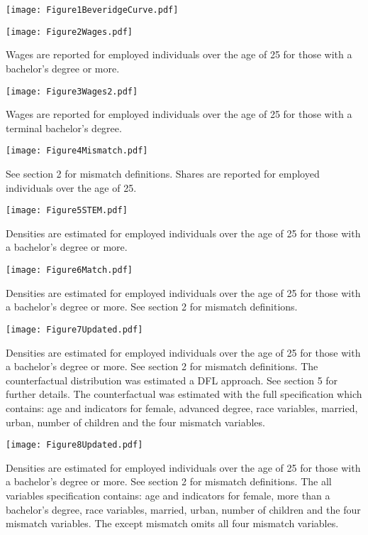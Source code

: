 \documentclass[11pt]{article}
\theoremstyle{definition}
\begin{document}
\begin{center}
\texttt{[image: Figure1BeveridgeCurve.pdf]}
\end{center}

\begin{center}
\texttt{[image: Figure2Wages.pdf]}
\end{center}
Wages are reported for employed individuals over the age of 25 for those with a bachelor's degree or more.  

\begin{center}
\texttt{[image: Figure3Wages2.pdf]}
\end{center}
Wages are reported for employed individuals over the age of 25 for those with a terminal bachelor's degree.  

\begin{center}
\texttt{[image: Figure4Mismatch.pdf]}
\end{center}
See section 2 for mismatch definitions.  Shares are reported for employed individuals over the age of 25.  

\begin{center}
\texttt{[image: Figure5STEM.pdf]}
\end{center}
Densities are estimated for employed individuals over the age of 25 for those with a bachelor's degree or more.  

\begin{center}
\texttt{[image: Figure6Match.pdf]}
\end{center}
Densities are estimated for employed individuals over the age of 25 for those with a bachelor's degree or more.  See section 2 for mismatch definitions.

\begin{center}
\texttt{[image: Figure7Updated.pdf]}
\end{center}
Densities are estimated for employed individuals over the age of 25 for those with a bachelor's degree or more.  See section 2 for mismatch definitions.  The counterfactual distribution was estimated a DFL approach.  See section 5 for further details. The counterfactual was estimated with the full specification which contains: age and indicators for female, advanced degree, race variables, married, urban, number of children and the four mismatch variables.

\begin{center}
\texttt{[image: Figure8Updated.pdf]}
\end{center}
Densities are estimated for employed individuals over the age of 25 for those with a bachelor's degree or more.  See section 2 for mismatch definitions.  The all variables specification contains: age and indicators for female, more than a bachelor's degree, race variables, married, urban, number of children and the four mismatch variables.  The except mismatch omits all four mismatch variables.     
\end{document}

